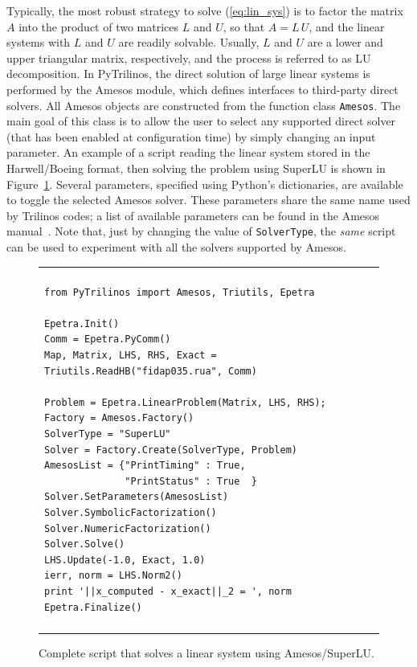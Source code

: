\documentclass[acmtocl]{acmtrans2m}
\begin{document}
\smallskip

Typically, the most robust strategy to solve (\ref{eq:lin_sys}) is to
factor the matrix $A$ into the product of two matrices $L$ and $U$, so
that $A = L \, U$, and the linear systems with $L$ and $U$ are readily
solvable. Usually, $L$ and $U$ are a lower and upper triangular
matrix, respectively, and the process is referred to as LU
decomposition. In PyTrilinos, the direct solution of large linear
systems is performed by the Amesos module, which defines interfaces to
third-party direct solvers. All Amesos objects are constructed from
the function class {\tt Amesos}.  The main goal of this class is to
allow the user to select any supported direct solver (that has been
enabled at configuration time) by simply changing an input
parameter. An example of a script reading the linear system stored in
the Harwell/Boeing format, then solving the problem using SuperLU is
shown in Figure~\ref{fig:amesos}.  Several parameters, specified using
Python's dictionaries, are available to toggle the selected Amesos
solver. These parameters share the same name used by Trilinos codes; a
list of available parameters can be found in the Amesos
manual~\cite{Amesos-Reference-Guide}. Note that, just by changing the
value of \verb!SolverType!, the {\sl same} script can be used to
experiment with all the solvers supported by Amesos.

\begin{figure}
  \begin{center}
    \begin{tabular}{| p{12cm} |}
      \hline \\
      \footnotesize
      \begin{minipage}{11.5cm}
\begin{verbatim}
from PyTrilinos import Amesos, Triutils, Epetra

Epetra.Init()
Comm = Epetra.PyComm()
Map, Matrix, LHS, RHS, Exact = Triutils.ReadHB("fidap035.rua", Comm)

Problem = Epetra.LinearProblem(Matrix, LHS, RHS);
Factory = Amesos.Factory()
SolverType = "SuperLU"
Solver = Factory.Create(SolverType, Problem)
AmesosList = {"PrintTiming" : True,
              "PrintStatus" : True  }
Solver.SetParameters(AmesosList)
Solver.SymbolicFactorization()
Solver.NumericFactorization()
Solver.Solve()
LHS.Update(-1.0, Exact, 1.0)
ierr, norm = LHS.Norm2()
print '||x_computed - x_exact||_2 = ', norm
Epetra.Finalize()
\end{verbatim}
      \end{minipage}
      \\
      \\
      \hline
    \end{tabular}
    \caption{Complete script that solves a linear system using
      Amesos/SuperLU.}
    \label{fig:amesos}
  \end{center}
\end{figure}
\end{document}
